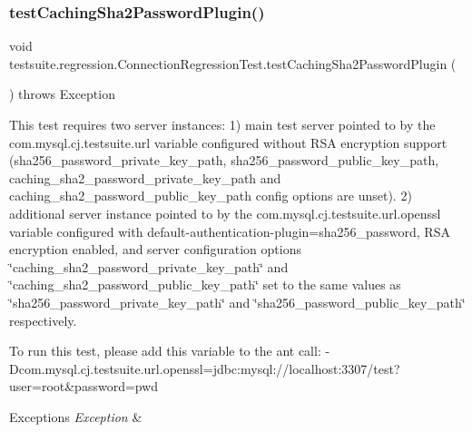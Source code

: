\subsubsection{\texorpdfstring{test\+Caching\+Sha2\+Password\+Plugin()}{testCachingSha2PasswordPlugin()}}
{\footnotesize\ttfamily void testsuite.\+regression.\+Connection\+Regression\+Test.\+test\+Caching\+Sha2\+Password\+Plugin (\begin{DoxyParamCaption}{ }\end{DoxyParamCaption}) throws Exception}

This test requires two server instances\+: 1) main test server pointed to by the com.\+mysql.\+cj.\+testsuite.\+url variable configured without R\+SA encryption support (sha256\+\_\+password\+\_\+private\+\_\+key\+\_\+path, sha256\+\_\+password\+\_\+public\+\_\+key\+\_\+path, caching\+\_\+sha2\+\_\+password\+\_\+private\+\_\+key\+\_\+path and caching\+\_\+sha2\+\_\+password\+\_\+public\+\_\+key\+\_\+path config options are unset). 2) additional server instance pointed to by the com.\+mysql.\+cj.\+testsuite.\+url.\+openssl variable configured with default-\/authentication-\/plugin=sha256\+\_\+password, R\+SA encryption enabled, and server configuration options \char`\"{}caching\+\_\+sha2\+\_\+password\+\_\+private\+\_\+key\+\_\+path\char`\"{} and \char`\"{}caching\+\_\+sha2\+\_\+password\+\_\+public\+\_\+key\+\_\+path\char`\"{} set to the same values as \char`\"{}sha256\+\_\+password\+\_\+private\+\_\+key\+\_\+path\char`\"{} and \char`\"{}sha256\+\_\+password\+\_\+public\+\_\+key\+\_\+path\char`\"{} respectively.

To run this test, please add this variable to the ant call\+: -\/\+Dcom.\+mysql.\+cj.\+testsuite.\+url.\+openssl=jdbc\+:mysql\+://localhost\+:3307/test?user=root\&password=pwd


\begin{DoxyExceptions}{Exceptions}
{\em Exception} & \\
\hline
\end{DoxyExceptions}
\mbox{\label{classtestsuite_1_1regression_1_1_connection_regression_test_a8bca083f14a9aedf92ba2d80fd44a71f}} 
